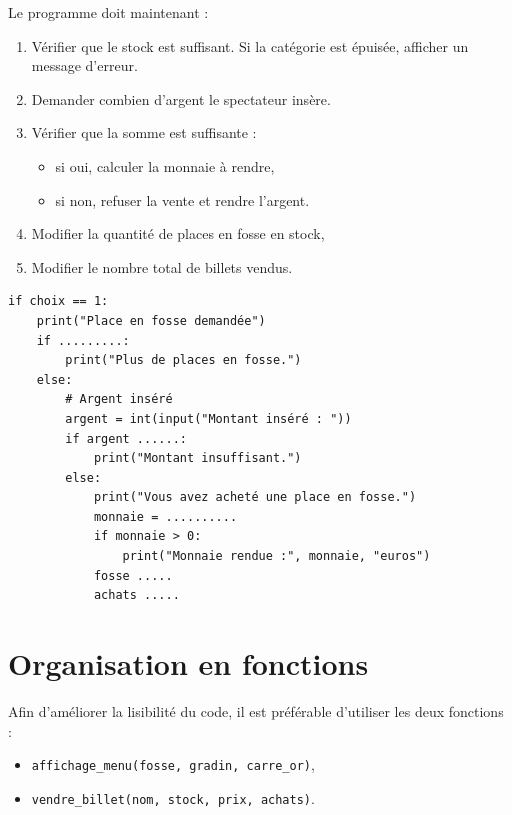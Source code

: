 Le programme doit maintenant :
\begin{enumerate}
    \item Vérifier que le stock est suffisant. Si la catégorie est épuisée, afficher un message d'erreur.
    \item Demander combien d'argent le spectateur insère.
    \item Vérifier que la somme est suffisante :
    \begin{itemize}
        \item si oui, calculer la monnaie à rendre,
        \item si non, refuser la vente et rendre l'argent.
    \end{itemize}
    \item Modifier la quantité de places en fosse en stock,
    \item Modifier le nombre total de billets vendus.
\end{enumerate}

\begin{verbatim}
if choix == 1:
    print("Place en fosse demandée")
    if .........:
        print("Plus de places en fosse.")
    else:
        # Argent inséré
        argent = int(input("Montant inséré : "))
        if argent ......:
            print("Montant insuffisant.")
        else:
            print("Vous avez acheté une place en fosse.")
            monnaie = ..........
            if monnaie > 0:
                print("Monnaie rendue :", monnaie, "euros")
            fosse .....
            achats .....
\end{verbatim}



\newpage

\section{Organisation en fonctions}

Afin d'améliorer la lisibilité du code, il est préférable d'utiliser les deux fonctions :
\begin{itemize}
    \item \texttt{affichage\_menu(fosse, gradin, carre\_or)},
    \item \texttt{vendre\_billet(nom, stock, prix, achats)}.
\end{itemize}

